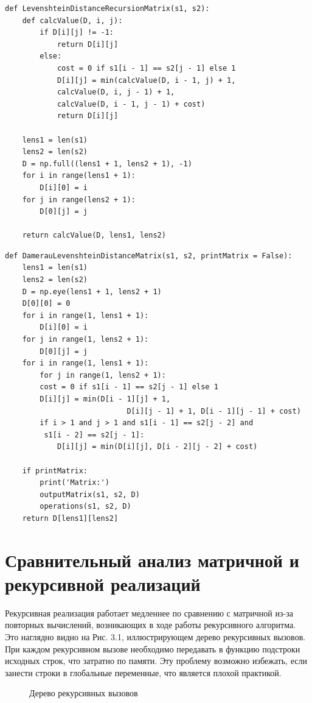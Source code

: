 \documentclass[12pt]{report}
\begin{document}
\newpage
\begin{lstlisting}[label=some-code,caption=Рекурсивный алгоритм нахождения расстояния Левенштейна с заполнением матрицы]
def LevenshteinDistanceRecursionMatrix(s1, s2):
	def calcValue(D, i, j):
		if D[i][j] != -1:
			return D[i][j]
		else:
			cost = 0 if s1[i - 1] == s2[j - 1] else 1
			D[i][j] = min(calcValue(D, i - 1, j) + 1,
			calcValue(D, i, j - 1) + 1,
			calcValue(D, i - 1, j - 1) + cost)
			return D[i][j]

	lens1 = len(s1)
	lens2 = len(s2)
	D = np.full((lens1 + 1, lens2 + 1), -1)
	for i in range(lens1 + 1):
		D[i][0] = i
	for j in range(lens2 + 1):
		D[0][j] = j

	return calcValue(D, lens1, lens2)
\end{lstlisting}

\begin{lstlisting}[label=some-code,caption=Матричный алгоритм нахождения расстояния Дамерау-Левенштейна]
def DamerauLevenshteinDistanceMatrix(s1, s2, printMatrix = False):
	lens1 = len(s1)
	lens2 = len(s2)
	D = np.eye(lens1 + 1, lens2 + 1)
	D[0][0] = 0
	for i in range(1, lens1 + 1):
		D[i][0] = i
	for j in range(1, lens2 + 1):
		D[0][j] = j
	for i in range(1, lens1 + 1):
		for j in range(1, lens2 + 1):
		cost = 0 if s1[i - 1] == s2[j - 1] else 1
		D[i][j] = min(D[i - 1][j] + 1, 
							D[i][j - 1] + 1, D[i - 1][j - 1] + cost)
		if i > 1 and j > 1 and s1[i - 1] == s2[j - 2] and
		 s1[i - 2] == s2[j - 1]:
			D[i][j] = min(D[i][j], D[i - 2][j - 2] + cost)
	
	if printMatrix:
		print('Matrix:')
		outputMatrix(s1, s2, D)
		operations(s1, s2, D)
	return D[lens1][lens2]
\end{lstlisting}

\section{Сравнительный анализ матричной и рекурсивной реализаций}
Рекурсивная реализация работает медленнее по сравнению с матричной из-за повторных вычислений, возникающих в ходе работы рекурсивного алгоритма. Это наглядно видно на Рис. 3.1, иллюстрирующем дерево рекурсивных вызовов. При каждом рекурсивном вызове необходимо передавать в функцию подстроки исходных строк, что затратно по памяти. Эту проблему возможно избежать, если занести строки в глобальные переменные, что является плохой практикой. 

\begin{figure}[ht!]
	\caption{Дерево рекурсивных вызовов}
\end{figure}
\end{document}
